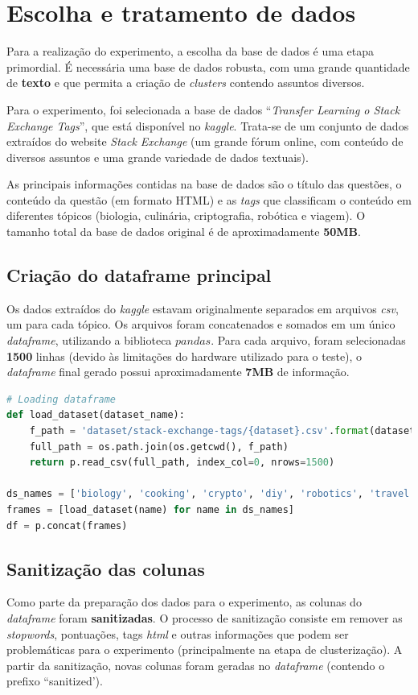 \section{Escolha e tratamento de dados}
Para a realização do experimento, a escolha da base de dados é uma etapa primordial.
É necessária uma base de dados robusta, com uma grande quantidade de \textbf{texto} e que permita a criação de \emph{clusters} contendo assuntos diversos.

Para o experimento, foi selecionada a base de dados ``\emph{Transfer Learning o Stack Exchange Tags}'', que está disponível no \emph{kaggle}.
Trata-se de um conjunto de dados extraídos do website \emph{Stack Exchange} (um grande fórum online, com conteúdo de diversos assuntos e uma grande variedade de dados textuais).

As principais informações contidas na base de dados são o título das questões, o conteúdo da questão (em formato HTML) e as \emph{tags} que classificam o conteúdo em diferentes tópicos (biologia, culinária, criptografia, robótica e viagem).
O tamanho total da base de dados original é de aproximadamente \textbf{50MB}. 

\subsection{Criação do dataframe principal}
Os dados extraídos do \emph{kaggle} estavam originalmente separados em arquivos \emph{csv}, um para cada tópico.
Os arquivos foram concatenados e somados em um único \emph{dataframe}, utilizando a biblioteca $pandas$.
Para cada arquivo, foram selecionadas \textbf{1500} linhas (devido às limitações do hardware utilizado para o teste), o \emph{dataframe} final gerado possui aproximadamente \textbf{7MB} de informação.


\begin{lstlisting}[language=Python, caption=Carregando base de dados]
# Loading dataframe
def load_dataset(dataset_name):
    f_path = 'dataset/stack-exchange-tags/{dataset}.csv'.format(dataset = dataset_name)
    full_path = os.path.join(os.getcwd(), f_path)
    return p.read_csv(full_path, index_col=0, nrows=1500)

ds_names = ['biology', 'cooking', 'crypto', 'diy', 'robotics', 'travel']
frames = [load_dataset(name) for name in ds_names]
df = p.concat(frames)
\end{lstlisting}

\subsection{Sanitização das colunas}
Como parte da preparação dos dados para o experimento, as colunas do \emph{dataframe} foram \textbf{sanitizadas}.
O processo de sanitização consiste em remover as \emph{stopwords}, pontuações, tags \emph{html} e outras informações que podem ser problemáticas para o experimento (principalmente na etapa de clusterização).
A partir da sanitização, novas colunas foram geradas no \emph{dataframe} (contendo o prefixo ``sanitized').

